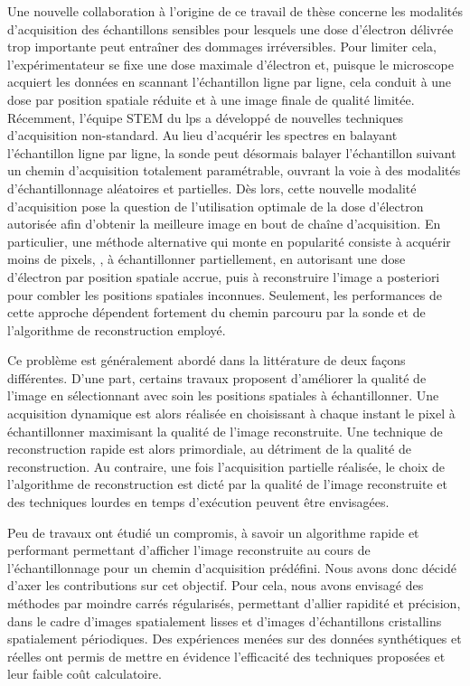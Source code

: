 Une nouvelle collaboration à l'origine de ce travail de thèse concerne les modalités d'acquisition des échantillons sensibles pour lesquels une dose d'électron délivrée trop importante peut entraîner des dommages irréversibles. Pour limiter cela, l'expérimentateur se fixe une dose maximale d'électron et, puisque le microscope acquiert les données en scannant l'échantillon ligne par ligne, cela conduit à une dose par position spatiale réduite et à une image finale de qualité limitée.
%
Récemment, l'équipe STEM du \gls{lps} a développé de nouvelles techniques d'acquisition non-standard. Au lieu d'acquérir les spectres en balayant l'échantillon ligne par ligne, la sonde peut désormais balayer l'échantillon suivant un chemin d'acquisition totalement paramétrable, ouvrant la voie à des modalités d'échantillonnage aléatoires et partielles. 
%
Dès lors, cette nouvelle modalité d'acquisition pose la question de l'utilisation optimale de la dose d'électron autorisée afin d'obtenir la meilleure image en bout de chaîne d'acquisition. 
%
En particulier, une méthode alternative qui monte en popularité consiste à acquérir moins de pixels, \ie{}, à échantillonner partiellement, en autorisant une dose d'électron par position spatiale accrue, puis à reconstruire l'image a posteriori pour combler les positions spatiales inconnues. Seulement, les performances de cette approche dépendent fortement du chemin parcouru par la sonde et de l'algorithme de reconstruction employé.

Ce problème est généralement abordé dans la littérature de deux façons différentes. D'une part, certains travaux proposent d'améliorer la qualité de l'image en sélectionnant avec soin les positions spatiales à échantillonner. Une acquisition dynamique est alors réalisée en choisissant à chaque instant le pixel à échantillonner maximisant la qualité de l'image reconstruite. Une technique de reconstruction rapide est alors primordiale, au détriment de la qualité de reconstruction. Au contraire, une fois l'acquisition partielle réalisée, le choix de l'algorithme de reconstruction est dicté par la qualité de l'image reconstruite et des techniques lourdes en temps d'exécution peuvent être envisagées. 

Peu de travaux ont étudié un compromis, à savoir un algorithme rapide et performant permettant d'afficher l'image reconstruite au cours de l'échantillonnage pour un chemin d'acquisition prédéfini.  Nous avons donc décidé d'axer les contributions sur cet objectif. Pour cela, nous avons envisagé des méthodes par moindre carrés régularisés, permettant d'allier rapidité et précision, dans le cadre d'images spatialement lisses et d'images d'échantillons cristallins spatialement périodiques. Des expériences menées sur des données synthétiques et réelles ont permis de mettre en évidence l'efficacité des techniques proposées et leur faible coût calculatoire. 

